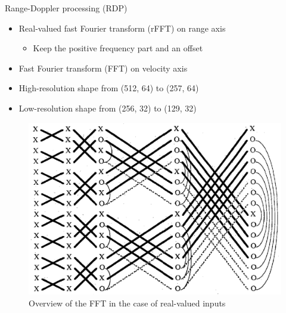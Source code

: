 \documentclass{beamer}
\begin{document}
\begin{frame}[t]{Range-Doppler processing (RDP)}
    \begin{itemize}
        \item Real-valued fast Fourier transform (rFFT) on range axis
        \begin{itemize}
            \vspace{0.2\baselineskip}
            \item Keep the positive frequency part and an offset
        \end{itemize}
        \vspace{0.2\baselineskip}
        \item Fast Fourier transform (FFT) on velocity axis
        \vspace{0.2\baselineskip}
        \item High-resolution shape from (512, 64) to (257, 64)
        \vspace{0.2\baselineskip}
        \item Low-resolution shape from (256, 32) to (129, 32)
    \end{itemize}

    \vspace{0.3\baselineskip}

    \begin{figure}
        \centering
        \includegraphics[scale=.27]{MA_presentation/figures/rfft.png}
        \caption{Overview of the FFT in the case of real-valued inputs \cite{sorensen_real-valued_1987}}
    \end{figure}

\end{frame}
\end{document}
